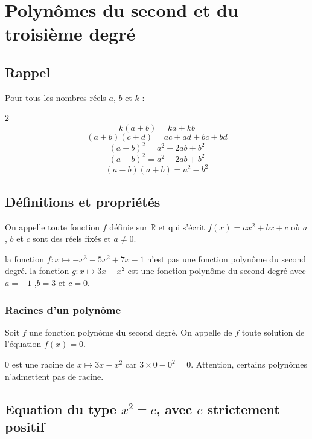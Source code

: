 \documentclass[french]{book}
\begin{document}
\chapter{Polynômes du second et du troisième degré}

\section{Rappel}
\begin{prop}
Pour tous les nombres réels $a$, $b$ et $k$ :
\begin{multicols}{2}
$$k(a+b)=ka+kb$$
$$(a+b)(c+d)=ac+ad+bc+bd$$
$$(a+b)^2=a^2+2ab+b^2$$
$$(a-b)^2=a^2-2ab+b^2$$
$$(a-b)(a+b)=a^2-b^2$$
\end{multicols}
\end{prop}
\section{Définitions et propriétés}
\begin{defn}
On appelle  toute fonction $f$ définie sur $\mathbb{R}$ et qui s'écrit $f(x)=ax^2+bx+c$ où $a$, $b$ et $c$ sont des réels fixés et $a\neq 0$.
\end{defn}

\begin{exemple}
la fonction $f:x\mapsto -x^{3}-5x^{2}+7x-1$  n'est pas une fonction polynôme du second degré. la fonction $g:x\mapsto 3x-x^{2}$ est une fonction polynôme du second degré avec $a=-1$ ,$b=3$ et $c=0$.
\end{exemple}

\subsection{Racines d'un polynôme}
\begin{defn}
Soit $f$ une fonction polynôme du second degré. On appelle  de $f$ toute solution de l'équation $f(x)=0$.
\vspace{5mm}
\end{defn}

\begin{exemple}
0 est une racine de $x\mapsto 3x-x^{2}$ car $3\times0-0^2=0$. Attention, certains polynômes n'admettent pas de racine.
\end{exemple}

\section{Equation du type $x^2=c$, avec $c$ strictement positif}
\end{document}
